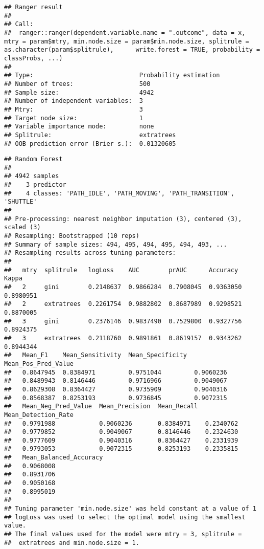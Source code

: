 \documentclass[]{article}
\begin{document}
\begin{verbatim}
## Ranger result
## 
## Call:
##  ranger::ranger(dependent.variable.name = ".outcome", data = x,      mtry = param$mtry, min.node.size = param$min.node.size, splitrule = as.character(param$splitrule),      write.forest = TRUE, probability = classProbs, ...) 
## 
## Type:                             Probability estimation 
## Number of trees:                  500 
## Sample size:                      4942 
## Number of independent variables:  3 
## Mtry:                             3 
## Target node size:                 1 
## Variable importance mode:         none 
## Splitrule:                        extratrees 
## OOB prediction error (Brier s.):  0.01320605
\end{verbatim}

\begin{verbatim}
## Random Forest 
## 
## 4942 samples
##    3 predictor
##    4 classes: 'PATH_IDLE', 'PATH_MOVING', 'PATH_TRANSITION', 'SHUTTLE' 
## 
## Pre-processing: nearest neighbor imputation (3), centered (3), scaled (3) 
## Resampling: Bootstrapped (10 reps) 
## Summary of sample sizes: 494, 495, 494, 495, 494, 493, ... 
## Resampling results across tuning parameters:
## 
##   mtry  splitrule   logLoss    AUC        prAUC      Accuracy   Kappa    
##   2     gini        0.2148637  0.9866284  0.7908045  0.9363050  0.8980951
##   2     extratrees  0.2261754  0.9882802  0.8687989  0.9298521  0.8870005
##   3     gini        0.2376146  0.9837490  0.7529800  0.9327756  0.8924375
##   3     extratrees  0.2118760  0.9891861  0.8619157  0.9343262  0.8944344
##   Mean_F1    Mean_Sensitivity  Mean_Specificity  Mean_Pos_Pred_Value
##   0.8647945  0.8384971         0.9751044         0.9060236          
##   0.8489943  0.8146446         0.9716966         0.9049067          
##   0.8629308  0.8364427         0.9735909         0.9040316          
##   0.8568387  0.8253193         0.9736845         0.9072315          
##   Mean_Neg_Pred_Value  Mean_Precision  Mean_Recall  Mean_Detection_Rate
##   0.9791988            0.9060236       0.8384971    0.2340762          
##   0.9779852            0.9049067       0.8146446    0.2324630          
##   0.9777609            0.9040316       0.8364427    0.2331939          
##   0.9793053            0.9072315       0.8253193    0.2335815          
##   Mean_Balanced_Accuracy
##   0.9068008             
##   0.8931706             
##   0.9050168             
##   0.8995019             
## 
## Tuning parameter 'min.node.size' was held constant at a value of 1
## logLoss was used to select the optimal model using the smallest value.
## The final values used for the model were mtry = 3, splitrule =
##  extratrees and min.node.size = 1.
\end{verbatim}
\end{document}
